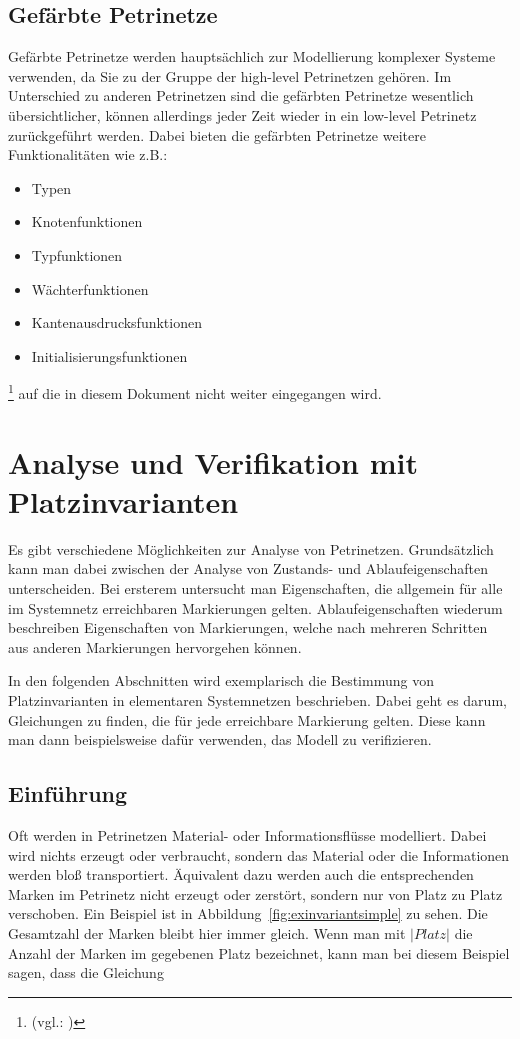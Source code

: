 	\subsection{Gefärbte Petrinetze}
		Gefärbte Petrinetze werden hauptsächlich zur Modellierung komplexer Systeme verwenden, da Sie zu der Gruppe der high-level Petrinetzen gehören.
		Im Unterschied zu anderen Petrinetzen sind die gefärbten Petrinetze wesentlich übersichtlicher, können allerdings jeder Zeit wieder in ein low-level Petrinetz zurückgeführt werden.
		Dabei bieten die gefärbten Petrinetze weitere Funktionalitäten wie z.B.:
		\begin{itemize}
		    \item Typen
		    \item Knotenfunktionen
		    \item Typfunktionen
		    \item Wächterfunktionen
		    \item Kantenausdrucksfunktionen
		    \item Initialisierungsfunktionen
		\end{itemize}
		\footnote{(vgl.: \cite{tu_dresden:petrinetze})}
		auf die in diesem Dokument nicht weiter eingegangen wird.

\section{Analyse und Verifikation mit Platzinvarianten}
	Es gibt verschiedene Möglichkeiten zur Analyse von Petrinetzen. Grundsätzlich kann man dabei zwischen der Analyse von Zustands- und Ablaufeigenschaften unterscheiden. Bei ersterem untersucht man Eigenschaften, die allgemein für alle im Systemnetz erreichbaren Markierungen gelten. Ablaufeigenschaften wiederum beschreiben Eigenschaften von Markierungen, welche nach mehreren Schritten aus anderen Markierungen hervorgehen können.

	In den folgenden Abschnitten wird exemplarisch die Bestimmung von Platzinvarianten in elementaren Systemnetzen beschrieben. Dabei geht es darum, Gleichungen zu finden, die für jede erreichbare Markierung gelten. Diese kann man dann beispielsweise dafür verwenden, das Modell zu verifizieren.

	\subsection{Einführung}
	\label{sub:platzinvarianten_einf}
		Oft werden in Petrinetzen Material- oder Informationsflüsse modelliert. Dabei wird nichts erzeugt oder verbraucht, sondern das Material oder die Informationen werden bloß transportiert. Äquivalent dazu werden auch die entsprechenden Marken im Petrinetz nicht erzeugt oder zerstört, sondern nur von Platz zu Platz verschoben. Ein Beispiel ist in Abbildung~\ref{fig:exinvariantsimple} zu sehen. Die Gesamtzahl der Marken bleibt hier immer gleich. Wenn man mit $|Platz|$ die Anzahl der Marken im gegebenen Platz bezeichnet, kann man bei diesem Beispiel sagen, dass die Gleichung

